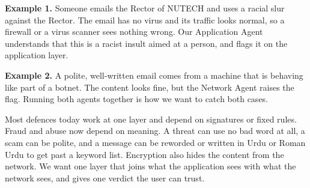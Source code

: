 \documentclass[10.5pt,a4paper]{article}
\newcommand{\head}[1]{\vspace{5pt}{\large\bfseries #1}\par\vspace{1pt}}
\begin{document}
\begin{center}
\end{center}

\textbf{Example 1.} Someone emails the Rector of NUTECH and uses a racial slur against the Rector. The email has no virus and its traffic looks normal, so a firewall or a virus scanner sees nothing wrong. Our Application Agent understands that this is a racist insult aimed at a person, and flags it on the application layer.

\textbf{Example 2.} A polite, well-written email comes from a machine that is behaving like part of a botnet. The content looks fine, but the Network Agent raises the flag. Running both agents together is how we want to catch both cases.

\head{2. Why this is needed}
Most defences today work at one layer and depend on signatures or fixed rules. Fraud and abuse now depend on meaning. A threat can use no bad word at all, a scam can be polite, and a message can be reworded or written in Urdu or Roman Urdu to get past a keyword list. Encryption also hides the content from the network. We want one layer that joins what the application sees with what the network sees, and gives one verdict the user can trust.
\end{document}
